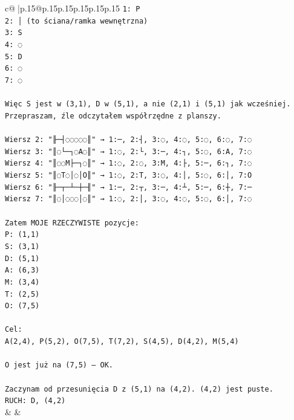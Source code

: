 \documentclass{article}
\begin{document}
{\begin{supertabular}{c@{$\;$}|p{.15\linewidth}@{}p{.15\linewidth}p{.15\linewidth}p{.15\linewidth}p{.15\linewidth}p{.15\linewidth}}
{{{\texttt{1: P} \\
\texttt{2: │ (to ściana/ramka wewnętrzna)} \\
\texttt{3: S} \\
\texttt{4: ◌} \\
\texttt{5: D} \\
\texttt{6: ◌} \\
\texttt{7: ◌} \\
\\ 
\texttt{Więc S jest w (3,1), D w (5,1), a nie (2,1) i (5,1) jak wcześniej. Przepraszam, źle odczytałem współrzędne z planszy.} \\
\\ 
\texttt{Wiersz 2: "╟─┤◌◌◌◌◌║" → 1:─, 2:┤, 3:◌, 4:◌, 5:◌, 6:◌, 7:◌} \\
\texttt{Wiersz 3: "║◌└─┐◌A◌║" → 1:◌, 2:└, 3:─, 4:┐, 5:◌, 6:A, 7:◌} \\
\texttt{Wiersz 4: "║◌◌M├─┐◌║" → 1:◌, 2:◌, 3:M, 4:├, 5:─, 6:┐, 7:◌} \\
\texttt{Wiersz 5: "║◌T◌│◌│O║" → 1:◌, 2:T, 3:◌, 4:│, 5:◌, 6:│, 7:O} \\
\texttt{Wiersz 6: "╟─┬─┴─┼─╢" → 1:─, 2:┬, 3:─, 4:┴, 5:─, 6:┼, 7:─} \\
\texttt{Wiersz 7: "║◌│◌◌◌│◌║" → 1:◌, 2:│, 3:◌, 4:◌, 5:◌, 6:│, 7:◌} \\
\\ 
\texttt{Zatem MOJE RZECZYWISTE pozycje:} \\
\texttt{P: (1,1)} \\
\texttt{S: (3,1)} \\
\texttt{D: (5,1)} \\
\texttt{A: (6,3)} \\
\texttt{M: (3,4)} \\
\texttt{T: (2,5)} \\
\texttt{O: (7,5)} \\
\\ 
\texttt{Cel:} \\
\texttt{A(2,4), P(5,2), O(7,5), T(7,2), S(4,5), D(4,2), M(5,4)} \\
\\ 
\texttt{O jest już na (7,5) – OK.} \\
\\ 
\texttt{Zaczynam od przesunięcia D z (5,1) na (4,2). (4,2) jest puste.} \\
\texttt{RUCH: D, (4,2)} \\
            }
        }
    }
    & & \\ \\


\end{supertabular}}
\end{document}
